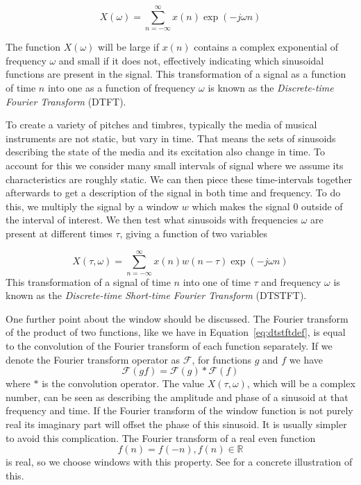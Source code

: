 \[
    X(\omega) = \sum_{n=-\infty}^{\infty} x(n) \exp(-j \omega n)
\]

The function $X(\omega)$ will be large if $x(n)$ contains a complex exponential of
frequency $\omega$ and small if it does not, effectively indicating which
sinusoidal functions are present in the signal. This transformation of a signal
as a function of time $n$ into one as a function of frequency $\omega$ is known
as the \textit{Discrete-time Fourier Transform} (DTFT). 

To create a variety of pitches and timbres, typically the media of musical
instruments are not static, but vary in time. That means the sets of sinusoids
describing the state of the media and its excitation also change in time. To
account for this we consider many small intervals of signal where we assume its
characteristics are roughly static. We can then piece these time-intervals
together afterwards to get a description of the signal in both time and
frequency. To do this, we multiply the signal by a window $w$ which makes the signal
0 outside of the interval of interest. We then test what sinusoids with
frequencies $\omega$ are present at different times $\tau$, giving a function of
two variables

\begin{equation}
    \label{eq:dtstftdef}
    X(\tau,\omega) = \sum_{n=-\infty}^{\infty} x(n) w(n - \tau) \exp(-j \omega n)
\end{equation}
This transformation of a signal of time $n$ into one of time $\tau$ and
frequency $\omega$ is known as the \textit{Discrete-time Short-time Fourier
Transform} (DTSTFT).

One further point about the window should be discussed. The Fourier transform of
the product of two functions, like we have in Equation~\ref{eq:dtstftdef}, is
equal to the convolution of the Fourier transform of each function separately.
If we denote the Fourier transform operator as $\mathcal{F}$, for functions $g$
and $f$ we have
\[
    \mathcal{F}(gf) = \mathcal{F}(g)\ast\mathcal{F}(f)
\]
where $\ast$ is the convolution operator. The value $X(\tau,\omega)$, which will
be a complex number, can be seen
as describing the amplitude and phase of a sinusoid at that frequency and time.
If the Fourier transform of the window function is not purely real its imaginary
part will offset the phase of this sinusoid. It is usually simpler to avoid this
complication. The Fourier transform of a real even function
\[
    f(n) = f(-n), f(n) \in \mathbb{R}
\]
is real, so we choose windows with this property. See
\cite[p.~52]{harris1978use} for a concrete illustration of this.

